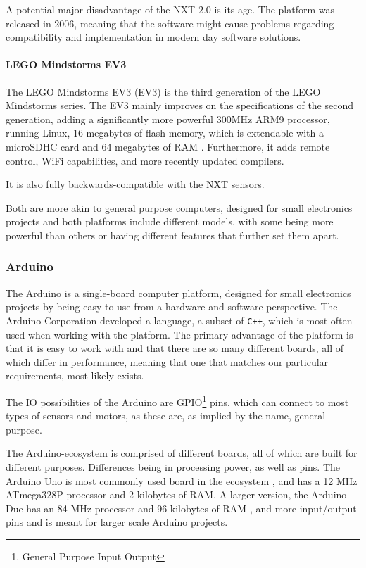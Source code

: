 A potential major disadvantage of the NXT 2.0 is its age.
The platform was released in 2006, meaning that the software might cause problems regarding compatibility and implementation in modern day software solutions.

\paragraph{LEGO Mindstorms EV3}
The  LEGO Mindstorms EV3 (EV3) is the third generation of the LEGO Mindstorms series.
The EV3 mainly improves on the specifications of the second generation, adding a significantly more powerful 300MHz ARM9 processor, running Linux, 16 megabytes of flash memory, which is extendable with a microSDHC card and 64 megabytes of RAM \cite{ev3userguide}.
Furthermore, it adds remote control, WiFi capabilities, and more recently updated compilers.

It is also fully backwards-compatible with the NXT sensors\cite{ev3nxtcompatability}.


Both are more akin to general purpose computers, designed for small electronics projects and both platforms include different models, with some being more powerful than others or having different features that further set them apart.


\subsubsection{Arduino}
The Arduino is a single-board computer platform, designed for small electronics projects by being easy to use from a hardware and software perspective.
The Arduino Corporation developed a language, a subset of \texttt{C++}, which is most often used when working with the platform.
The primary advantage of the platform is that it is easy to work with and that there are so many different boards, all of which differ in performance, meaning that one that matches our particular requirements, most likely exists.

The IO possibilities of the Arduino are GPIO\footnote{General Purpose Input Output} pins, which can connect to most types of sensors and motors, as these are, as implied by the name, general purpose.

The Arduino-ecosystem is comprised of different boards, all of which are built for different purposes.
Differences being in processing power, as well as pins.
The Arduino Uno is most commonly used board in the ecosystem \cite{ArduinoUno3}, and has a 12 MHz ATmega328P processor and 2 kilobytes of RAM.
A larger version, the Arduino Due has an 84 MHz processor and 96 kilobytes of RAM \cite{ArduinoDue}, and more input/output pins and is meant for larger scale Arduino projects.

